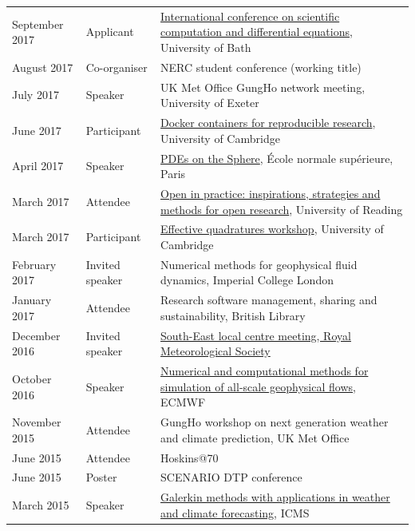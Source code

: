 \documentclass[a4paper,11pt]{article}
\begin{document}
\begin{tabularx}{\linewidth}{l l X}
September 2017 & Applicant & \href{https://sites.google.com/site/scicade2017/}{International conference on scientific computation and differential equations}, University of Bath \\
August 2017 & Co-organiser & NERC student conference (working title) \\
July 2017 & Speaker & UK Met Office GungHo network meeting, University of Exeter \\
June 2017 & Participant & \href{https://www.software.ac.uk/c4rr}{Docker containers for reproducible research}, University of Cambridge \\
April 2017 & Speaker & \href{https://forge.ipsl.jussieu.fr/heat/wiki/PDEs2017}{PDEs on the Sphere}, École normale supérieure, Paris \\
March 2017 & Attendee & \href{https://blogs.reading.ac.uk/open-research/open-in-practice-inspirations-strategies-and-methods-for-open-research/}{Open in practice: inspirations, strategies and methods for open research}, University of Reading \\
March 2017 & Participant & \href{http://www.effective-quadratures.org/eq2017}{Effective quadratures workshop}, University of Cambridge \\
February 2017 & Invited speaker & Numerical methods for geophysical fluid dynamics, Imperial College London \\
January 2017 & Attendee & Research software management, sharing and sustainability, British Library \\
December 2016 & Invited speaker & \href{https://www.rmets.org/events/meteorological-research-within-university-reading-2016}{South-East local centre meeting, Royal Meteorological Society} \\
October 2016 & Speaker & \href{http://www.ecmwf.int/en/learning/workshops-and-seminars/workshop-numerical-and-computational-methods-simulation-all-scale-geophysical-flows}{Numerical and computational methods for simulation of all-scale geophysical flows}, ECMWF \\
November 2015 & Attendee & GungHo workshop on next generation weather and climate prediction, UK Met Office \\
June 2015 & Attendee & Hoskins@70 \\
June 2015 & Poster & SCENARIO DTP conference \\
March 2015 & Speaker & \href{http://www.icms.org.uk/workshop.php?id=334}{Galerkin methods with applications in weather and climate forecasting}, ICMS \\
\end{tabularx}
\end{document}

